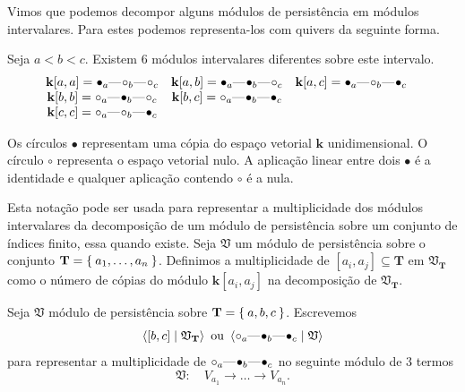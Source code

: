 Vimos que podemos decompor alguns módulos de persistência em módulos intervalares. Para estes podemos representa-los 
com quivers da seguinte forma. 
\begin{ex}
    Seja $a < b < c$. Existem $6$ módulos intervalares diferentes sobre este intervalo.
\begin{equation*} 
    \begin{matrix}
        \mathbf{k}[a,a] = \qon{a} \qem \qoff{b} \qem \qoff{c} & \mathbf{k}[a,b] = \qon{a} \qem \qon{b} \qem \qoff{c}& 
                            \mathbf{k}[a,c] = \qon{a} \qem \qoff{b} \qem \qon{c}\\
        \mathbf{k}[b,b] = \qoff{a} \qem \qon{b} \qem \qoff{c}& \mathbf{k}[b,c] = \qoff{a} \qem \qon{b} \qem \qon{c}& \\
        \mathbf{k}[c,c] = \qoff{a} \qem \qoff{b} \qem \qon{c}& & & 
    \end{matrix}
\end{equation*}
\end{ex}

Os círculos $\bullet$ representam uma cópia do espaço vetorial $\mathbf{k}$ unidimensional. O círculo $\circ$ representa o 
espaço vetorial nulo. A aplicação linear entre dois $\bullet$ é a identidade e qualquer aplicação contendo $\circ$ é a
nula.

Esta notação pode ser usada para representar a multiplicidade dos módulos intervalares da decomposição
de um módulo de persistência sobre um conjunto de índices finito, essa quando existe. Seja $\mathfrak{V}$
um módulo de persistência sobre o conjunto $\mathbf{T} = \Set{a_1, \dots, a_n}$. Definimos a multiplicidade
de $[a_i, a_j] \subseteq \mathbf{T}$ em $\mathfrak{V}_{\mathbf{T}}$ como o número de cópias do módulo
$\mathbf{k}[a_i,a_j]$ na decomposição de $\mathfrak{V}_{\mathbf{T}}$. 

\begin{ex}
    Seja $\mathfrak{V}$ módulo de persistência sobre $\mathbf{T} = \Set{a,b,c}$. Escrevemos
    \begin{equation*}
        \innerproduct{[b,c] \mid \mathfrak{V}_{\mathbf{T}}} \text{ ou } \innerproduct{\qoff{a} \qem \qon{b} 
        \qem \qon{c} \mid \mathfrak{V}}
    \end{equation*}
    para representar a multiplicidade de $\qoff{a} \qem \qon{b} \qem \qon{c}$ no seguinte módulo de $3$ termos
    \begin{equation*}
        \mathfrak{V} : \quad V_{a_1} \longrightarrow \dots \longrightarrow V_{a_n}.
    \end{equation*}
\end{ex}


